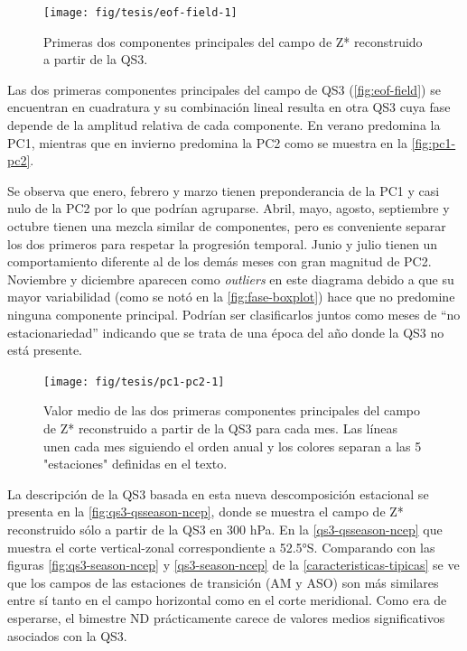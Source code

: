 \documentclass[spanish,a4paper,12pt,oneside]{book}
\begin{document}
\begin{figure}
\texttt{[image: fig/tesis/eof-field-1]} \caption{Primeras dos componentes principales del campo de Z* reconstruido a partir de la QS3.}\label{fig:eof-field}
\end{figure}

Las dos primeras componentes principales del campo de QS3
(\autoref{fig:eof-field}) se encuentran en cuadratura y su combinación
lineal resulta en otra QS3 cuya fase depende de la amplitud relativa de
cada componente. En verano predomina la PC1, mientras que en invierno
predomina la PC2 como se muestra en la \autoref{fig:pc1-pc2}.

Se observa que enero, febrero y marzo tienen preponderancia de la PC1 y
casi nulo de la PC2 por lo que podrían agruparse. Abril, mayo, agosto,
septiembre y octubre tienen una mezcla similar de componentes, pero es
conveniente separar los dos primeros para respetar la progresión
temporal. Junio y julio tienen un comportamiento diferente al de los
demás meses con gran magnitud de PC2. Noviembre y diciembre aparecen
como \emph{outliers} en este diagrama debido a que su mayor variabilidad
(como se notó en la \autoref{fig:fase-boxplot}) hace que no predomine
ninguna componente principal. Podrían ser clasificarlos juntos como
meses de ``no estacionariedad'' indicando que se trata de una época del
año donde la QS3 no está presente.

\begin{figure}
\texttt{[image: fig/tesis/pc1-pc2-1]} \caption{Valor medio de las dos primeras componentes principales del campo de Z* reconstruido a partir de la QS3 para cada mes. Las líneas unen cada mes siguiendo el orden anual y los colores separan a las 5 "estaciones" definidas en el texto.}\label{fig:pc1-pc2}
\end{figure}

La descripción de la QS3 basada en esta nueva descomposición estacional
se presenta en la \autoref{fig:qs3-qsseason-ncep}, donde se muestra el
campo de Z* reconstruido sólo a partir de la QS3 en 300 hPa. En la
\autoref{qs3-qsseason-ncep} que muestra el corte vertical-zonal
correspondiente a 52.5°S. Comparando con las figuras
\ref{fig:qs3-season-ncep} y \ref{qs3-season-ncep} de la
\autoref{caracteristicas-tipicas} se ve que los campos de las estaciones
de transición (AM y ASO) son más similares entre sí tanto en el campo
horizontal como en el corte meridional. Como era de esperarse, el
bimestre ND prácticamente carece de valores medios significativos
asociados con la QS3.
\end{document}
